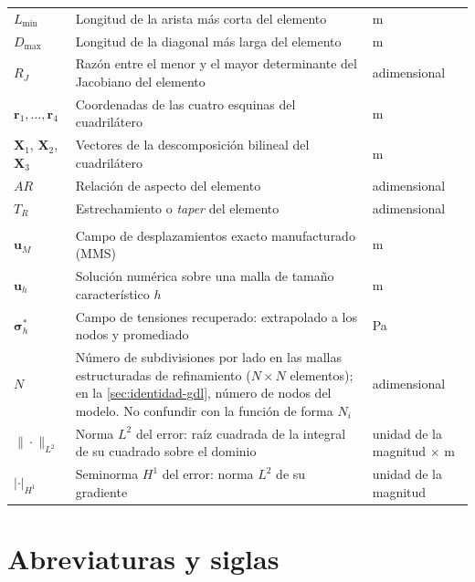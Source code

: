 \begin{longtable}{@{}>{\raggedright\arraybackslash}p{3.0cm}p{7.8cm}p{3.0cm}@{}}
$L_{\min}$ & Longitud de la arista más corta del elemento & m \\
$D_{\max}$ & Longitud de la diagonal más larga del elemento & m \\
$R_J$ & Razón entre el menor y el mayor determinante del Jacobiano del elemento & adimensional \\
$\bm{r}_1,\dots,\bm{r}_4$ & Coordenadas de las cuatro esquinas del cuadrilátero & m \\
$\bm{X}_1$, $\bm{X}_2$, $\bm{X}_3$ & Vectores de la descomposición bilineal del cuadrilátero & m \\
$AR$ & Relación de aspecto del elemento & adimensional \\
$T_R$ & Estrechamiento o \emph{taper} del elemento & adimensional \\
\addlinespace
\multicolumn{3}{@{}l}{\textbf{Verificación y validación}} \\
\addlinespace
$\bm{u}_M$ & Campo de desplazamientos exacto manufacturado (MMS) & m \\
$\bm{u}_h$ & Solución numérica sobre una malla de tamaño característico $h$ & m \\
$\bm{\sigma}^*_h$ & Campo de tensiones recuperado: extrapolado a los nodos y promediado & Pa \\
$N$ & Número de subdivisiones por lado en las mallas estructuradas de refinamiento ($N\times N$ elementos); en la \autoref{sec:identidad-gdl}, número de nodos del modelo. No confundir con la función de forma $N_i$ & adimensional \\
$\|\cdot\|_{L^2}$ & Norma $L^2$ del error: raíz cuadrada de la integral de su cuadrado sobre el dominio & unidad de la magnitud $\times$ m \\
$|\cdot|_{H^1}$ & Seminorma $H^1$ del error: norma $L^2$ de su gradiente & unidad de la magnitud \\
\end{longtable}

\section*{Abreviaturas y siglas}

